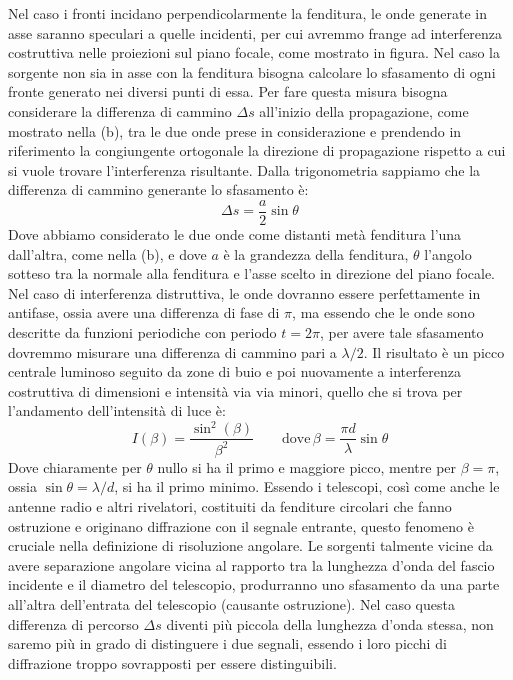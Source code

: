 Nel caso i fronti incidano perpendicolarmente la fenditura, le onde generate in asse saranno speculari a quelle incidenti, per cui avremmo frange ad interferenza costruttiva nelle proiezioni sul piano focale, come mostrato in figura. Nel caso la sorgente non sia in asse con la fenditura bisogna calcolare lo sfasamento di ogni fronte generato nei diversi punti di essa. Per fare questa misura bisogna considerare la differenza di cammino $\Delta s$ all'inizio della propagazione, come mostrato nella (b), tra le due onde prese in considerazione e prendendo in riferimento la congiungente ortogonale la direzione di propagazione rispetto a cui si vuole trovare l'interferenza risultante. Dalla trigonometria sappiamo che la differenza di cammino generante lo sfasamento è:
\begin{equation*}
	\Delta s = \frac{a}{2}\sin\theta
\end{equation*}
Dove abbiamo considerato le due onde come distanti metà fenditura l'una dall'altra, come nella (b), e dove $a$ è la grandezza della fenditura, $\theta$ l'angolo sotteso tra la normale alla fenditura e l'asse scelto in direzione del piano focale. Nel caso di interferenza distruttiva, le onde dovranno essere perfettamente in antifase, ossia avere una differenza di fase di $\pi$, ma essendo che le onde sono descritte da funzioni periodiche con periodo $t=2\pi$, per avere tale sfasamento dovremmo misurare una differenza di cammino pari a $\lambda/2$. Il risultato è un picco centrale luminoso seguito da zone di buio e poi nuovamente a interferenza costruttiva di dimensioni e intensità via via minori, quello che si trova per l'andamento dell'intensità di luce è:
\begin{equation*}
	I(\beta) = \frac{\sin^2(\beta)}{\beta^2} \qquad \text{dove} \,
	\beta = \frac{\pi d}{\lambda}\sin\theta
\end{equation*}
Dove chiaramente per $\theta$ nullo si ha il primo e maggiore picco, mentre per $\beta=\pi$, ossia $\sin\theta=\lambda/d$, si ha il primo minimo. Essendo i telescopi, così come anche le antenne radio e altri rivelatori, costituiti da fenditure circolari che fanno ostruzione e originano diffrazione con il segnale entrante, questo fenomeno è cruciale nella definizione di risoluzione angolare. Le sorgenti talmente vicine da avere separazione angolare vicina al rapporto tra la lunghezza d'onda del fascio incidente e il diametro del telescopio, produrranno uno sfasamento da una parte all'altra dell'entrata del telescopio (causante ostruzione). Nel caso questa differenza di percorso $\Delta s$ diventi più piccola della lunghezza d'onda stessa, non saremo più in grado di distinguere i due segnali, essendo i loro picchi di diffrazione troppo sovrapposti per essere distinguibili.

